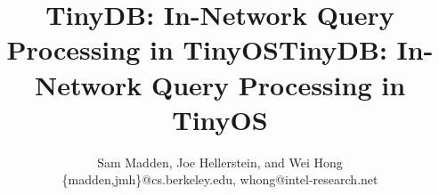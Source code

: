 \documentclass[11pt]{article}
\title{\vspace{2.5in} TinyDB:  In-Network Query Processing in TinyOS}
\title{TinyDB:  In-Network Query Processing in TinyOS}
\author{Sam Madden, Joe Hellerstein, and Wei Hong \\
        \{madden,jmh\}@cs.berkeley.edu, whong@intel-research.net}
\date{}
\newif\ifpdf\ifx\pdfoutput\undefined\pdffalse\else\pdfoutput=1\pdftrue\fi
\newcommand{\pdfgraphics}{\ifpdf\DeclareGraphicsExtensions{.pdf,.jpg}\else\fi}
\begin{document}
\pdfgraphics
{}

\maketitle
\begin{latexonly}
\vspace{2in}
\end{latexonly}
\begin{center}
Version 0.4 \\
September, 2003
\end{center}


\thispagestyle{empty}
\begin{latexonly}\newpage\end{latexonly}
\tableofcontents
\begin{latexonly}\newpage\end{latexonly}

\section{What's New In This Release}

This document refers to the TinyDB 1.1 release, which 
accompanied TinyOS 1.1 and was officially released September, 2003
and represents major changes to the functionality and stability
of TinyDB, particularly over the 1.0 release.

For users already familiar with TinyDB, new features in this release
include:
\end{document}

